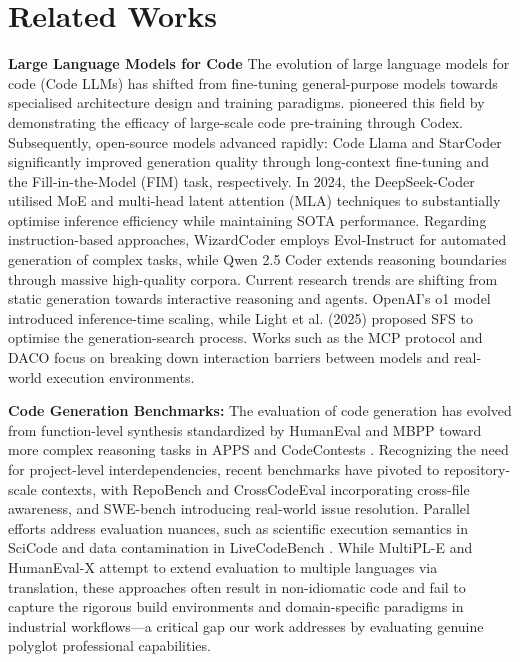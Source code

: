 \documentclass{article}
\theoremstyle{plain}
\theoremstyle{definition}
\theoremstyle{remark}
\begin{document}
\section{Related Works}
\textbf{Large Language Models for Code}
The evolution of large language models for code (Code LLMs) has shifted from fine-tuning general-purpose models towards 
specialised architecture design and training paradigms.  \cite{chen2021evaluating} pioneered this field by demonstrating 
the efficacy of large-scale code pre-training through Codex. Subsequently, open-source models advanced rapidly: Code 
Llama \cite{roziere2023code} and StarCoder \cite{li2023starcoder} significantly improved generation quality through 
long-context fine-tuning and the Fill-in-the-Model (FIM) task, respectively. In 2024, the DeepSeek-Coder  utilised 
MoE and multi-head latent attention (MLA) techniques \cite{zhu2024deepseek} to substantially optimise inference efficiency 
while maintaining SOTA performance. Regarding instruction-based approaches, 
WizardCoder \cite{luo2023wizardcoder} employs Evol-Instruct for automated generation of complex tasks, while Qwen 2.5 Coder \cite{hui2024qwen2} extends reasoning boundaries through massive high-quality corpora. Current research trends are shifting from static generation towards interactive reasoning and agents. OpenAI's o1 model introduced inference-time scaling, while Light et al. (2025) proposed SFS \cite{lightsfs} to optimise the generation-search process. Works such as the MCP protocol and DACO \cite{wu2024daco} focus on breaking down interaction barriers between models and real-world execution environments.

\textbf{Code Generation Benchmarks:} 
The evaluation of code generation has evolved from function-level synthesis standardized by HumanEval \cite{chen2021evaluating} and 
MBPP \cite{austin2021program} toward more complex reasoning tasks in APPS \cite{hendrycks2021measuring} and CodeContests \cite{li2022competition}. 
Recognizing the need for project-level interdependencies, recent benchmarks have pivoted to repository-scale contexts, with RepoBench \cite{liu2023repobench} and CrossCodeEval \cite{ding2023crosscodeeval} incorporating cross-file awareness, and SWE-bench \cite{jimenez2024swebench} introducing real-world issue resolution. Parallel efforts address evaluation nuances, such as scientific execution semantics in SciCode \cite{tian2024scicoderesearchcodingbenchmark} and data contamination in LiveCodeBench \cite{jain2024livecodebench}. While MultiPL-E \cite{cassano2023multiple} and HumanEval-X \cite{zheng2023codegeex} attempt to extend evaluation to multiple languages via translation, these approaches often result in non-idiomatic code and fail to capture the rigorous build environments and domain-specific paradigms in industrial workflows—a critical gap our work addresses by evaluating genuine polyglot professional capabilities.
\end{document}
